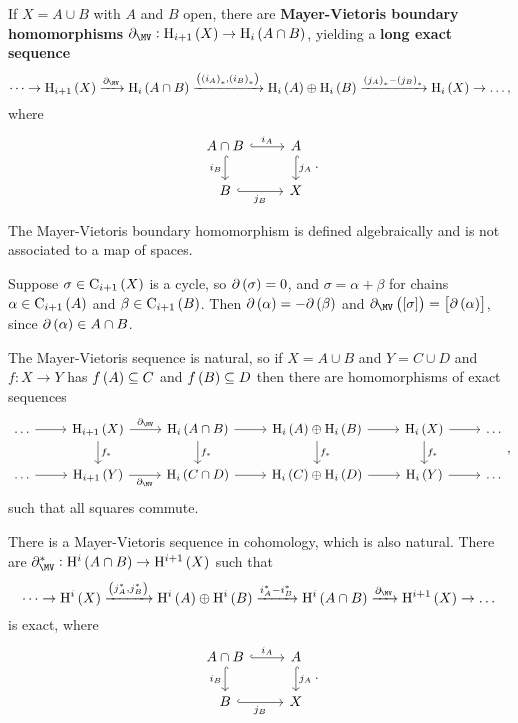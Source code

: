\pagebreak

\begin{theorem}
If $ X = A \cup B $ with $ A $ and $ B $ open, there are \textbf{Mayer-Vietoris boundary homomorphisms} $ \da_{\MV} : \H_{i + 1}\br{X} \to \H_i\br{A \cap B} $, yielding a \textbf{long exact sequence}
$$ \dots \to \H_{i + 1}\br{X} \xrightarrow{\da_{\MV}} \H_i\br{A \cap B} \xrightarrow{\br{\br{i_A}_*, \br{i_B}_*}} \H_i\br{A} \oplus \H_i\br{B} \xrightarrow{\br{j_A}_* - \br{j_B}_*} \H_i\br{X} \to \dots, $$
where
$$
\begin{tikzcd}
A \cap B \arrow[hookrightarrow]{r}{i_A} \arrow[hookrightarrow]{d}[swap]{i_B} & A \arrow[hookrightarrow]{d}{j_A} \\
B \arrow[hookrightarrow]{r}[swap]{j_B} & X
\end{tikzcd}.
$$
\end{theorem}

The Mayer-Vietoris boundary homomorphism is defined algebraically and is not associated to a map of spaces.

\begin{remark*}
Suppose $ \sigma \in \C_{i + 1}\br{X} $ is a cycle, so $ \da\br{\sigma} = 0 $, and $ \sigma = \alpha + \beta $ for chains $ \alpha \in \C_{i + 1}\br{A} $ and $ \beta \in \C_{i + 1}\br{B} $. Then $ \da\br{\alpha} = -\da\br{\beta} $ and $ \da_{\MV}\br{\sbr{\sigma}} = \sbr{\da\br{\alpha}} $, since $ \da\br{\alpha} \in A \cap B $.
\end{remark*}

\begin{remark*}
The Mayer-Vietoris sequence is natural, so if $ X = A \cup B $ and $ Y = C \cup D $ and $ f : X \to Y $ has $ f\br{A} \subseteq C $ and $ f\br{B} \subseteq D $ then there are homomorphisms of exact sequences
$$
\begin{tikzcd}
\dots \arrow{r} & \H_{i + 1}\br{X} \arrow{r}{\da_{\MV}} \arrow{d}{f_*} & \H_i\br{A \cap B} \arrow{r} \arrow{d}{f_*} & \H_i\br{A} \oplus \H_i\br{B} \arrow{r} \arrow{d}{f_*} & \H_i\br{X} \arrow{r} \arrow{d}{f_*} & \dots \\
\dots \arrow{r} & \H_{i + 1}\br{Y} \arrow{r}[swap]{\da_{\MV}} & \H_i\br{C \cap D} \arrow{r} & \H_i\br{C} \oplus \H_i\br{D} \arrow{r} & \H_i\br{Y} \arrow{r} & \dots
\end{tikzcd},
$$
such that all squares commute.
\end{remark*}

\begin{remark*}
There is a Mayer-Vietoris sequence in cohomology, which is also natural. There are $ \da_{\MV}^* : \H^i\br{A \cap B} \to \H^{i + 1}\br{X} $ such that
$$ \dots \to \H^i\br{X} \xrightarrow{\br{j_A^*, j_B^*}} \H^i\br{A} \oplus \H^i\br{B} \xrightarrow{i_A^* - i_B^*} \H^i\br{A \cap B} \xrightarrow{\da_{\MV}} \H^{i + 1}\br{X} \to \dots $$
is exact, where
$$
\begin{tikzcd}
A \cap B \arrow[hookrightarrow]{r}{i_A} \arrow[hookrightarrow]{d}[swap]{i_B} & A \arrow[hookrightarrow]{d}{j_A} \\
B \arrow[hookrightarrow]{r}[swap]{j_B} & X
\end{tikzcd}.
$$
\end{remark*}

